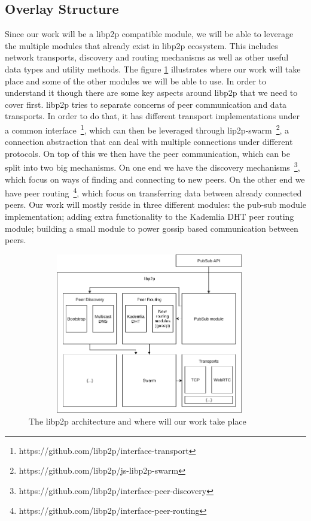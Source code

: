 \subsection{Overlay Structure}\label{overlay-structure-solution}

Since our work will be a libp2p compatible module, we will be able to
leverage the multiple modules that already exist in libp2p ecosystem.
This includes network transports, discovery and routing mechanisms as
well as other useful data types and utility methods. The figure \ref{fig:libp2p-stack}
illustrates where our work will take place and
some of the other modules we will be able to use. In order to understand
it though there are some key aspects around libp2p that we need to cover
first. libp2p tries to separate concerns of peer communication and data
transports. In order to do that, it has different transport implementations
under a common interface~\footnote{https://github.com/libp2p/interface-transport},
which can then be leveraged through lip2p-swarm~\footnote{https://github.com/libp2p/js-libp2p-swarm},
a connection abstraction that can deal with multiple
connections under different protocols. On top of this we then have the
peer communication, which can be split into two big mechanisms. On one
end we have the discovery mechanisms~\footnote{https://github.com/libp2p/interface-peer-discovery},
which focus on ways of finding and connecting to new peers.
On the other end we have peer routing~\footnote{https://github.com/libp2p/interface-peer-routing},
which focus on transferring data between already connected
peers. Our work will mostly reside in three different modules: the
pub-sub module implementation; adding extra functionality to the
Kademlia DHT peer routing module; building a small module to power
gossip based communication between peers.

\begin{figure}[hb!]
  \centering
  \includegraphics[max height=7cm,max width=0.95\textwidth]{img/libp2p-stack.png}
  \caption{The libp2p architecture and where will our work take place}
  \label{fig:libp2p-stack}
\end{figure}

